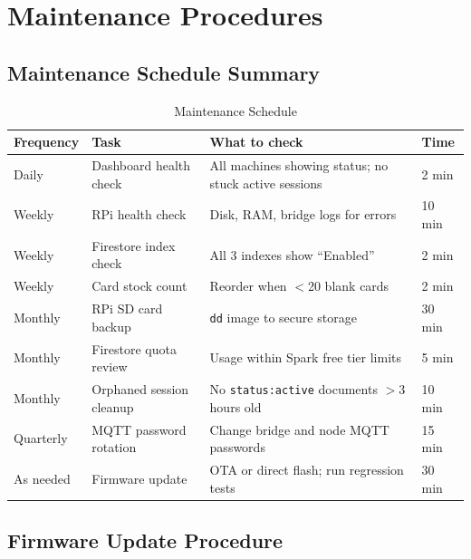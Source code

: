 \chapter{Maintenance Procedures}
\label{ch:maintenance}

\section{Maintenance Schedule Summary}

\begin{table}[H]
\centering
\caption{Maintenance Schedule}
\begin{tabular}{L{3cm}L{4.5cm}L{5.5cm}C{2cm}}
\toprule
\textbf{Frequency} & \textbf{Task} & \textbf{What to check} & \textbf{Time} \\
\midrule
Daily & Dashboard health check & All machines showing status; no stuck active sessions & 2 min \\
Weekly & RPi health check & Disk, RAM, bridge logs for errors & 10 min \\
Weekly & Firestore index check & All 3 indexes show ``Enabled'' & 2 min \\
Weekly & Card stock count & Reorder when $<$20 blank cards & 2 min \\
Monthly & RPi SD card backup & \texttt{dd} image to secure storage & 30 min \\
Monthly & Firestore quota review & Usage within Spark free tier limits & 5 min \\
Monthly & Orphaned session cleanup & No \texttt{status:active} documents $>$3 hours old & 10 min \\
Quarterly & MQTT password rotation & Change bridge and node MQTT passwords & 15 min \\
As needed & Firmware update & OTA or direct flash; run regression tests & 30 min \\
\bottomrule
\end{tabular}
\end{table}

\section{Firmware Update Procedure}

